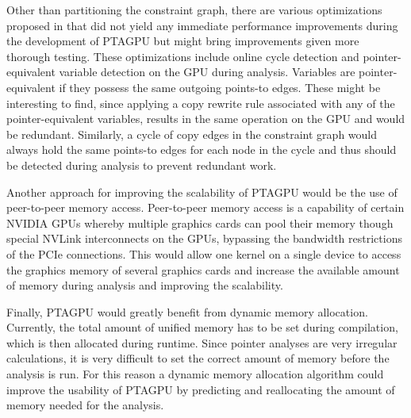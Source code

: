 Other than partitioning the constraint graph, there are various optimizations proposed in \cite{mendez2012gpu} that did not yield any immediate performance improvements during the development of PTAGPU but might bring improvements given more thorough testing.
These optimizations include online cycle detection and pointer-equivalent variable detection on the GPU during analysis.
Variables are pointer-equivalent if they possess the same outgoing points-to edges. These might be interesting to find, since applying a copy rewrite rule associated with any of the pointer-equivalent variables, results in the same operation on the GPU and would be redundant.
Similarly, a cycle of copy edges in the constraint graph would always hold the same points-to edges for each node in the cycle and thus should be detected during analysis to prevent redundant work.

Another approach for improving the scalability of PTAGPU would be the use of peer-to-peer memory access.
Peer-to-peer memory access is a capability of certain NVIDIA GPUs whereby multiple graphics cards can pool their memory though special NVLink interconnects on the GPUs, bypassing the bandwidth restrictions of the PCIe connections.
This would allow one kernel on a single device to access the graphics memory of several graphics cards and increase the available amount of memory during analysis and improving the scalability.

Finally, PTAGPU would greatly benefit from dynamic memory allocation. Currently, the total amount of unified memory has to be set during compilation, which is then allocated during runtime.
Since pointer analyses are very irregular calculations, it is very difficult to set the correct amount of memory before the analysis is run.
For this reason a dynamic memory allocation algorithm could improve the usability of PTAGPU by predicting and reallocating the amount of memory needed for the analysis.

